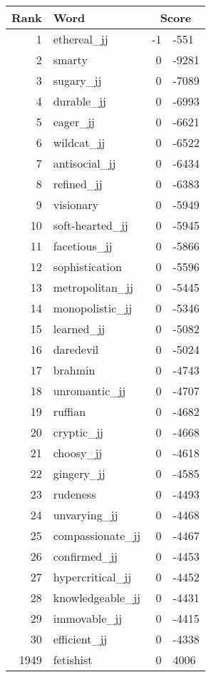 \begin{longtable}[!htbp]{| rlr@{.}l |}
    \hline
    \textbf{Rank} & \textbf{Word} & \multicolumn{2}{c|}{\textbf{Score}} \\
    \hline
    \endhead
    1 & ethereal\_jj & -1 & -551 \\
    2 & smarty & 0 & -9281 \\
    3 & sugary\_jj & 0 & -7089 \\
    4 & durable\_jj & 0 & -6993 \\
    5 & eager\_jj & 0 & -6621 \\
    6 & wildcat\_jj & 0 & -6522 \\
    7 & antisocial\_jj & 0 & -6434 \\
    8 & refined\_jj & 0 & -6383 \\
    9 & visionary & 0 & -5949 \\
    10 & soft-hearted\_jj & 0 & -5945 \\
    11 & facetious\_jj & 0 & -5866 \\
    12 & sophistication & 0 & -5596 \\
    13 & metropolitan\_jj & 0 & -5445 \\
    14 & monopolistic\_jj & 0 & -5346 \\
    15 & learned\_jj & 0 & -5082 \\
    16 & daredevil & 0 & -5024 \\
    17 & brahmin & 0 & -4743 \\
    18 & unromantic\_jj & 0 & -4707 \\
    19 & ruffian & 0 & -4682 \\
    20 & cryptic\_jj & 0 & -4668 \\
    21 & choosy\_jj & 0 & -4618 \\
    22 & gingery\_jj & 0 & -4585 \\
    23 & rudeness & 0 & -4493 \\
    24 & unvarying\_jj & 0 & -4468 \\
    25 & compassionate\_jj & 0 & -4467 \\
    26 & confirmed\_jj & 0 & -4453 \\
    27 & hypercritical\_jj & 0 & -4452 \\
    28 & knowledgeable\_jj & 0 & -4431 \\
    29 & immovable\_jj & 0 & -4415 \\
    30 & efficient\_jj & 0 & -4338 \\
    1949 & fetishist & 0 & 4006 \\

\end{longtable}
